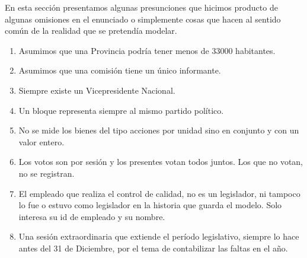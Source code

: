 En esta secci\'on presentamos algunas presunciones que hicimos producto de algunas omisiones en el enunciado o simplemente cosas que hacen al sentido com\'un de la realidad que se pretend\'ia modelar.

\begin{enumerate}
	\item Asumimos que una Provincia podr\'ia tener menos de 33000 habitantes.
	\item Asumimos que una comisi\'on tiene un \'unico informante.
	\item Siempre existe un Vicepresidente Nacional.
	\item Un bloque representa siempre al mismo partido pol\'itico.
	\item No se mide los bienes del tipo acciones por unidad sino en conjunto y con un valor entero.
	\item Los votos son por sesi\'on y los presentes votan todos juntos. Los que no votan, no se registran.
	\item El empleado que realiza el control de calidad, no es un legislador, ni tampoco lo fue o estuvo como legislador en la historia que guarda el modelo. Solo interesa su id de empleado y su nombre.
	\item Una sesi\'on extraordinaria que extiende el per\'iodo legislativo, siempre lo hace antes del 31 de Diciembre, por el tema de contabilizar las faltas en el a\~no.
\end{enumerate}
